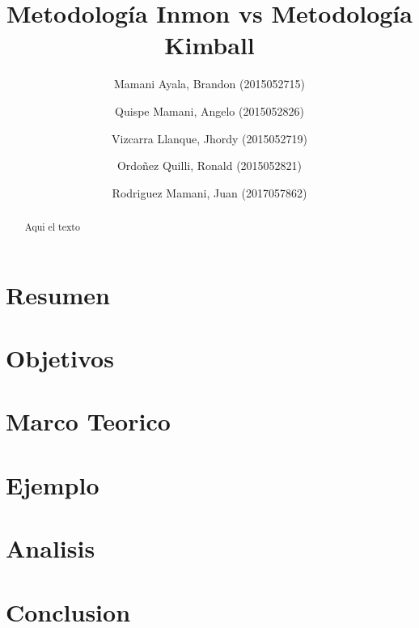 \documentclass[preprint,12pt]{elsarticle}
\begin{document}
	
	\begin{frontmatter}
		
		
		\title{\huge Metodología Inmon vs Metodología Kimball}
		
		\author{Mamani Ayala, Brandon        (2015052715)}
		\author{Quispe Mamani, Angelo	      (2015052826)}
		\author{Vizcarra Llanque, Jhordy	      (2015052719)}
		\author{Ordoñez Quilli, Ronald          (2015052821)}
		\author{Rodriguez Mamani, Juan      (2017057862)}
		
		\address{Tacna, Perú}
		
		\begin{abstract}
			Aqui el texto 
		\end{abstract}
\end{frontmatter}

	
	
	\section{Resumen}
	
	

\section{Objetivos}
	
	

\section{Marco Teorico}

\section{Ejemplo}

\section{Analisis}

\section{Conclusion}

	
	
\end{document}
